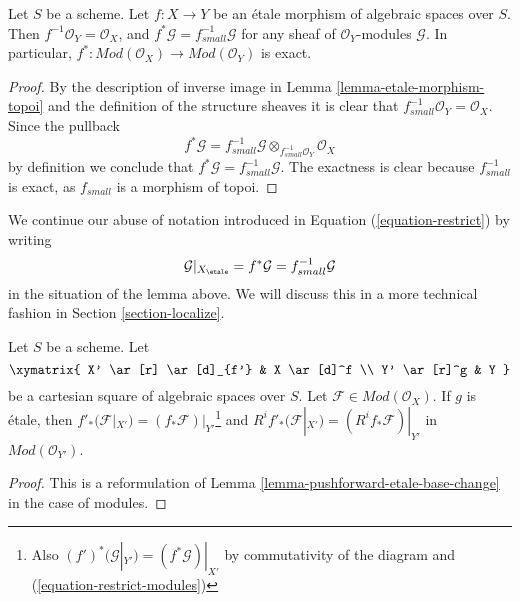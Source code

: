 \begin{lemma}
\label{lemma-etale-exact-pullback}
Let $S$ be a scheme.
Let $f : X \to Y$ be an \'etale morphism of algebraic spaces over $S$.
Then $f^{-1}\mathcal{O}_Y = \mathcal{O}_X$, and
$f^*\mathcal{G} = f_{small}^{-1}\mathcal{G}$ for any sheaf of
$\mathcal{O}_Y$-modules $\mathcal{G}$. In particular,
$f^* : \textit{Mod}(\mathcal{O}_X) \to \textit{Mod}(\mathcal{O}_Y)$
is exact.
\end{lemma}

\begin{proof}
By the description of inverse image in Lemma \ref{lemma-etale-morphism-topoi}
and the definition of the structure sheaves it is clear that
$f_{small}^{-1}\mathcal{O}_Y = \mathcal{O}_X$. Since the pullback
$$
f^*\mathcal{G} =
f_{small}^{-1}\mathcal{G} \otimes_{f_{small}^{-1}\mathcal{O}_Y}
\mathcal{O}_X
$$
by definition we conclude that $f^*\mathcal{G} = f_{small}^{-1}\mathcal{G}$.
The exactness is clear because $f_{small}^{-1}$ is exact, as $f_{small}$
is a morphism of topoi.
\end{proof}

\noindent
We continue our abuse of notation introduced in
Equation (\ref{equation-restrict})
by writing
\begin{equation}
\label{equation-restrict-modules}
\mathcal{G}|_{X_\etale}
= f^*\mathcal{G}
= f_{small}^{-1}\mathcal{G}
\end{equation}
in the situation of the lemma above. We will discuss this in a more
technical fashion in
Section \ref{section-localize}.

\begin{lemma}
\label{lemma-pushforward-etale-base-change-modules}
Let $S$ be a scheme. Let
$$
\xymatrix{
X' \ar[r] \ar[d]_{f'} & X \ar[d]^f \\
Y' \ar[r]^g & Y
}
$$
be a cartesian square of algebraic spaces over $S$. Let
$\mathcal{F} \in \textit{Mod}(\mathcal{O}_X)$. If $g$ is \'etale, then
$f'_*(\mathcal{F}|_{X'}) = (f_*\mathcal{F})|_{Y'}$\footnote{Also
$(f')^*(\mathcal{G}|_{Y'}) = (f^*\mathcal{G})|_{X'}$
by commutativity of the diagram and (\ref{equation-restrict-modules})} and
$R^if'_*(\mathcal{F}|_{X'}) = (R^if_*\mathcal{F})|_{Y'}$ in
$\textit{Mod}(\mathcal{O}_{Y'})$.
\end{lemma}

\begin{proof}
This is a reformulation of
Lemma \ref{lemma-pushforward-etale-base-change}
in the case of modules.
\end{proof}

